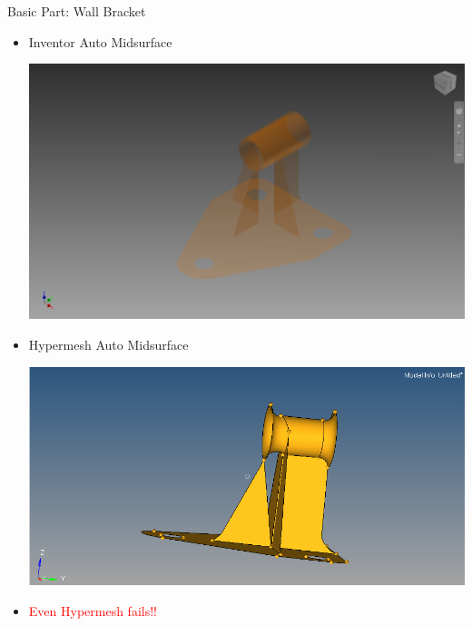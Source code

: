 
\begin{frame}{Basic Part: Wall Bracket}
\begin{itemize}[noitemsep,label=\textbullet,topsep=2pt,parsep=2pt,partopsep=2pt]

\item Inventor Auto Midsurface

\includegraphics[width=0.5\linewidth]{../Common/images/InventorWallBracketMids.png}

\item Hypermesh Auto Midsurface

\includegraphics[width=0.5\linewidth]{../Common/images/HypermeshWallBracket.png}

\item \textcolor{red}{Even Hypermesh fails!!}
\end{itemize}
\end{frame}
